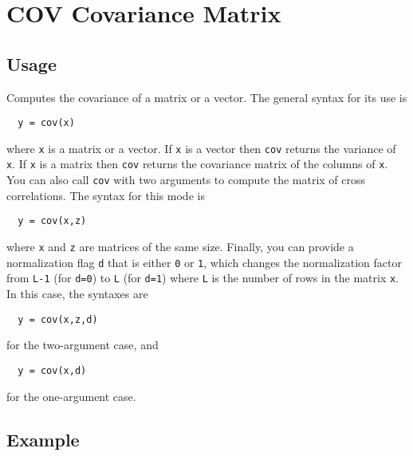 \section{COV Covariance Matrix}

\subsection{Usage}

Computes the covariance of a matrix or a vector.  The general
syntax for its use is
\begin{verbatim}
  y = cov(x)
\end{verbatim}
where \verb|x| is a matrix or a vector.  If \verb|x| is a vector then
\verb|cov| returns the variance of \verb|x|.  If \verb|x| is a matrix then
\verb|cov| returns the covariance matrix of the columns of \verb|x|.
You can also call \verb|cov| with two arguments to compute the 
matrix of cross correlations.  The syntax for this mode is
\begin{verbatim}
  y = cov(x,z)
\end{verbatim}
where \verb|x| and \verb|z| are matrices of the same size.  Finally,
you can provide a normalization flag \verb|d| that is either \verb|0|
or \verb|1|, which changes the normalization factor from \verb|L-1| (for \verb|d=0|) to 
\verb|L| (for \verb|d=1|) where \verb|L| is the number of rows in the matrix \verb|x|.  In
this case, the syntaxes are
\begin{verbatim}
  y = cov(x,z,d)
\end{verbatim}
for the two-argument case, and
\begin{verbatim}
  y = cov(x,d)
\end{verbatim}
for the one-argument case.
\subsection{Example}

